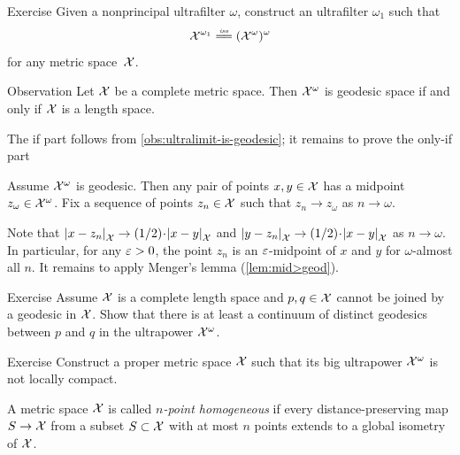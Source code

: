 \begin{thm}{Exercise}\label{ex:ultrapower(ultrapower)}
Given a nonprincipal ultrafilter $\omega$, construct an ultrafilter $\omega_1$ such that 
\[\spc{X}^{\omega_1}\iso(\spc{X}^\omega)^\omega\]
for any metric space~$\mathcal{X}$.

\end{thm}


\begin{thm}{Observation}\label{obs:ultrapower-is-geodesic}
Let $\mathcal{X}$ be a complete metric space. 
Then $\mathcal{X}^\omega$ is geodesic space if and only if $\mathcal{X}$ is a length space.
\end{thm}

The if part follows from \ref{obs:ultralimit-is-geodesic}; it remains to prove the only-if part

Assume $\mathcal{X}^\omega$ is geodesic.
Then any pair of points $x,y\in \mathcal{X}$ has a midpoint $z_\omega\in\mathcal{X}^\omega$.
Fix a sequence of points $z_n\in  \mathcal{X}$ such that $z_n\to z_\omega$ as $n\to \omega$.

Note that 
$\dist{x}{z_n}{\spc{X}}\to \tfrac12\cdot \dist{x}{y}{\spc{X}}$
and 
$\dist{y}{z_n}{\spc{X}}\to \tfrac12\cdot \dist{x}{y}{\spc{X}}$
as 
$n\to\omega$.
In particular, for any $\varepsilon>0$, the point $z_n$ is an $\varepsilon$-midpoint of $x$ and $y$ for $\omega$-almost all $n$.
It remains to apply Menger's lemma (\ref{lem:mid>geod}).
\qeds

\begin{thm}{Exercise}\label{ex:two-geodesics-in-ultrapower}
Assume $\mathcal{X}$ is a complete length space 
and $p,q\in\mathcal{X}$ cannot be joined by a geodesic in $\mathcal{X}$.  
Show that there is at least a continuum of distinct geodesics between $p$ and $q$ 
in the ultrapower $\mathcal{X}^\omega$.
\end{thm}

\begin{thm}{Exercise}\label{ex:notproper-limit}
Construct a proper metric space $\mathcal{X}$ such that its big ultrapower $\mathcal{X}^\omega$ is not locally compact.
\end{thm}

{

\sloppy

A metric space $\mathcal{X}$ is called \emph{$n$-point homogeneous} if every distance-preserving map $S\to \mathcal{X}$ from a subset $S\subset\mathcal{X}$ with at most $n$ points extends to a global isometry of $\mathcal{X}$.

}

